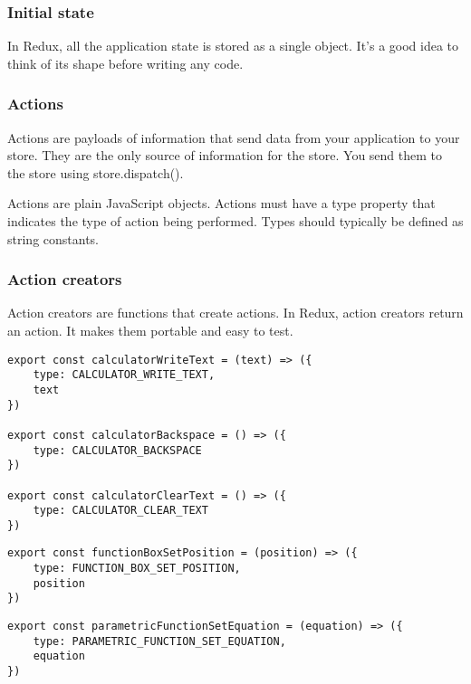 \subsubsection{Initial state}
In Redux, all the application state is stored as a single object. It's a good idea to think of its shape before writing any code.

\subsubsection{Actions}
Actions are payloads of information that send data from your application to your store. They are the only source of information for the store. You send them to the store using store.dispatch().

Actions are plain JavaScript objects. Actions must have a type property that indicates the type of action being performed. Types should typically be defined as string constants.

\subsubsection{Action creators}
Action creators are functions that create actions. In Redux, action creators return an action. It makes them portable and easy to test.


\begin{lstlisting}
export const calculatorWriteText = (text) => ({
    type: CALCULATOR_WRITE_TEXT,
    text
})

export const calculatorBackspace = () => ({
    type: CALCULATOR_BACKSPACE
})

export const calculatorClearText = () => ({
    type: CALCULATOR_CLEAR_TEXT
})
\end{lstlisting}


\begin{lstlisting}
export const functionBoxSetPosition = (position) => ({
    type: FUNCTION_BOX_SET_POSITION,
    position
})
\end{lstlisting}


\begin{lstlisting}
export const parametricFunctionSetEquation = (equation) => ({
    type: PARAMETRIC_FUNCTION_SET_EQUATION,
    equation
})
\end{lstlisting}


